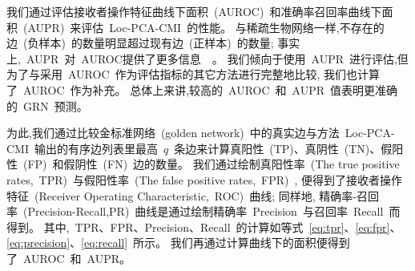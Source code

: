 我们通过评估接收者操作特征曲线下面积~(AUROC)~和准确率召回率曲线下面积~(AUPR)~来评估~Loc-PCA-CMI~的性能。
与稀疏生物网络一样,不存在的边~(负样本)~的数量明显超过现有边~(正样本)~的数量; 
事实上,~AUPR~对~AUROC提供了更多信息~\cite{saito2015precision}~。
我们倾向于使用~AUPR~进行评估,但为了与采用~AUROC~作为评估指标的其它方法进行完整地比较,
我们也计算了~AUROC~作为补充。
总体上来讲,较高的~AUROC~和~AUPR~值表明更准确的~GRN~预测。

为此,我们通过比较金标准网络~(golden network)~中的真实边与方法~Loc-PCA-CMI~输出的有序边列表里最高~$q$~条边来计算真阳性~(TP)、真阴性~(TN)、假阳性~(FP)~和假阴性~(FN)~边的数量。
我们通过绘制真阳性率~(The true positive rates,~TPR)~与假阳性率~(The false positive rates,~FPR)~,
便得到了接收者操作特征~(Receiver Operating Characteristic,~ROC)~曲线; 
同样地,
精确率-召回率~(Precision-Recall,PR)~曲线是通过绘制精确率~Precision~与召回率~Recall~而得到。
其中,~TPR、FPR、Precision、Recall~的计算如等式~\ref{eq:tpr}、\ref{eq:fpr}、\ref{eq:precision}、\ref{eq:recall}~所示。
我们再通过计算曲线下的面积便得到了~AUROC~和~AUPR。

